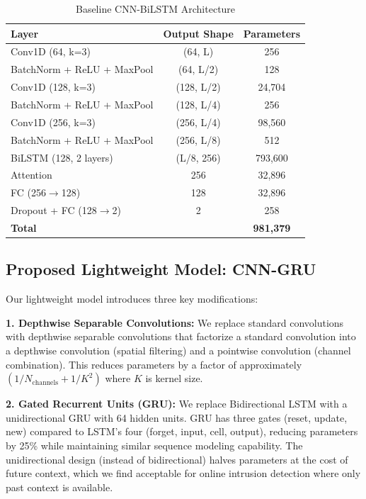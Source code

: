 \documentclass[a4paper,fleqn]{cas-sc}
\begin{document}
\begin{table}[t]
\centering
\caption{Baseline CNN-BiLSTM Architecture}
\label{tab:baseline}
\begin{tabular}{lcc}
\toprule
Layer & Output Shape & Parameters \\
\midrule
Conv1D (64, k=3) & (64, L) & 256 \\
BatchNorm + ReLU + MaxPool & (64, L/2) & 128 \\
Conv1D (128, k=3) & (128, L/2) & 24,704 \\
BatchNorm + ReLU + MaxPool & (128, L/4) & 256 \\
Conv1D (256, k=3) & (256, L/4) & 98,560 \\
BatchNorm + ReLU + MaxPool & (256, L/8) & 512 \\
BiLSTM (128, 2 layers) & (L/8, 256) & 793,600 \\
Attention & 256 & 32,896 \\
FC (256$\rightarrow$128) & 128 & 32,896 \\
Dropout + FC (128$\rightarrow$2) & 2 & 258 \\
\midrule
\textbf{Total} & & \textbf{981,379} \\
\bottomrule
\end{tabular}
\end{table}

\subsection{Proposed Lightweight Model: CNN-GRU}
\label{sec:lightweight}

Our lightweight model introduces three key modifications:

\noindent\textbf{1. Depthwise Separable Convolutions:} We replace standard convolutions with depthwise separable convolutions that factorize a standard convolution into a depthwise convolution (spatial filtering) and a pointwise convolution (channel combination). This reduces parameters by a factor of approximately $(1/N_{\text{channels}} + 1/K^2)$ where $K$ is kernel size.

\noindent\textbf{2. Gated Recurrent Units (GRU):} We replace Bidirectional LSTM with a unidirectional GRU with 64 hidden units. GRU has three gates (reset, update, new) compared to LSTM's four (forget, input, cell, output), reducing parameters by 25\% while maintaining similar sequence modeling capability. The unidirectional design (instead of bidirectional) halves parameters at the cost of future context, which we find acceptable for online intrusion detection where only past context is available.
\end{document}
